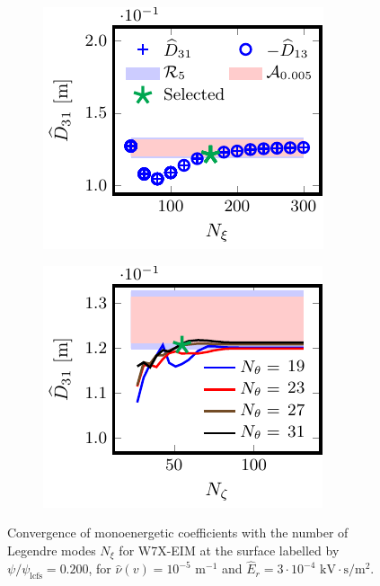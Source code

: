 \documentclass[10pt]{iopart}
\begin{document}
\begin{figure}[]
	
	\begin{subfigure}[t]{0.32\textwidth}
		\includegraphics{Convergence-Legendre-W7X-EIM-s0200-Er-3e-4-D31-Detail}
		\caption{}
		\label{subfig:D31_convergence_Legendre_W7X_EIM_0200_Erho_3e-4_Detail}
	\end{subfigure}
	\begin{subfigure}[t]{0.32\textwidth}
		\includegraphics{Convergence-theta-zeta-W7X-EIM-s0200-Er-3e-4-D31}
		\caption{}
		\label{subfig:D31_convergence_theta_zeta_W7X_EIM_0200_Erho_3e-4_Detail}
	\end{subfigure}
	
	
	\caption{Convergence of monoenergetic coefficients with the number of Legendre modes $N_\xi$ for W7X-EIM at the surface labelled by $\psi/\psi_{\text{lcfs}}=0.200$, for $\hat{\nu}(v)=10^{-5}$ $\text{m}^{-1}$ and $\widehat{E}_r=3\cdot 10^{-4}$ $\text{kV}\cdot\text{s}/\text{m}^2$.}
	\label{fig:Convergence_W7X_EIM_Er_3e-4}
\end{figure}
\end{document}

